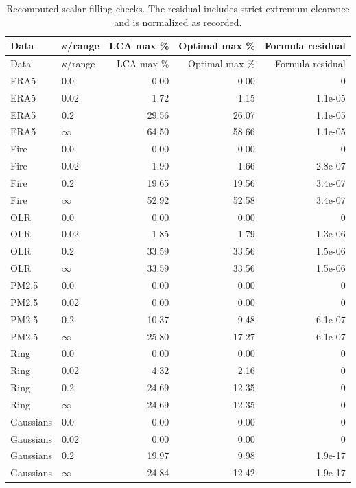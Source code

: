 \begingroup\small\setlength{\tabcolsep}{4pt}
\begin{longtable}{llrrr}
\caption{Recomputed scalar filling checks. The residual includes strict-extremum clearance and is normalized as recorded.}\\\toprule
Data & $\kappa$/range & LCA max \% & Optimal max \% & Formula residual\\\midrule\endfirsthead
\toprule Data & $\kappa$/range & LCA max \% & Optimal max \% & Formula residual\\\midrule\endhead
\bottomrule\endfoot
ERA5 & 0.0 & 0.00 & 0.00 & 0\\
ERA5 & 0.02 & 1.72 & 1.15 & 1.1e-05\\
ERA5 & 0.2 & 29.56 & 26.07 & 1.1e-05\\
ERA5 & $\infty$ & 64.50 & 58.66 & 1.1e-05\\
Fire & 0.0 & 0.00 & 0.00 & 0\\
Fire & 0.02 & 1.90 & 1.66 & 2.8e-07\\
Fire & 0.2 & 19.65 & 19.56 & 3.4e-07\\
Fire & $\infty$ & 52.92 & 52.58 & 3.4e-07\\
OLR & 0.0 & 0.00 & 0.00 & 0\\
OLR & 0.02 & 1.85 & 1.79 & 1.3e-06\\
OLR & 0.2 & 33.59 & 33.56 & 1.5e-06\\
OLR & $\infty$ & 33.59 & 33.56 & 1.5e-06\\
PM2.5 & 0.0 & 0.00 & 0.00 & 0\\
PM2.5 & 0.02 & 0.00 & 0.00 & 0\\
PM2.5 & 0.2 & 10.37 & 9.48 & 6.1e-07\\
PM2.5 & $\infty$ & 25.80 & 17.27 & 6.1e-07\\
Ring & 0.0 & 0.00 & 0.00 & 0\\
Ring & 0.02 & 4.32 & 2.16 & 0\\
Ring & 0.2 & 24.69 & 12.35 & 0\\
Ring & $\infty$ & 24.69 & 12.35 & 0\\
Gaussians & 0.0 & 0.00 & 0.00 & 0\\
Gaussians & 0.02 & 0.00 & 0.00 & 0\\
Gaussians & 0.2 & 19.97 & 9.98 & 1.9e-17\\
Gaussians & $\infty$ & 24.84 & 12.42 & 1.9e-17\\
\end{longtable}\endgroup

